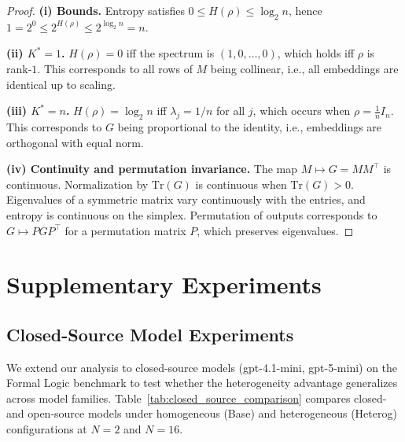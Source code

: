 \documentclass{article}
\theoremstyle{plain}
\theoremstyle{definition}
\theoremstyle{remark}
\begin{document}
\begin{proof}
\textbf{(i) Bounds.}
Entropy satisfies $0\le H(\rho)\le \log_2 n$, hence
$1=2^0\le 2^{H(\rho)}\le 2^{\log_2 n}=n$.

\textbf{(ii) $K^*=1$.}
$H(\rho)=0$ iff the spectrum is $(1,0,\ldots,0)$, which holds iff $\rho$ is rank-$1$.
This corresponds to all rows of $M$ being collinear, i.e., all embeddings are identical up to scaling.

\textbf{(iii) $K^*=n$.}
$H(\rho)=\log_2 n$ iff $\lambda_j=1/n$ for all $j$, which occurs when $\rho=\frac{1}{n}I_n$.
This corresponds to $G$ being proportional to the identity, i.e., embeddings are orthogonal with equal norm.

\textbf{(iv) Continuity and permutation invariance.}
The map $M\mapsto G=MM^\top$ is continuous.
Normalization by $\mathrm{Tr}(G)$ is continuous when $\mathrm{Tr}(G)>0$.
Eigenvalues of a symmetric matrix vary continuously with the entries, and entropy is continuous on the simplex.
Permutation of outputs corresponds to $G\mapsto PGP^\top$ for a permutation matrix $P$, which preserves eigenvalues.
\end{proof}


\section{Supplementary Experiments}

\subsection{Closed-Source Model Experiments}
\label{sec:closed_source}

We extend our analysis to closed-source models (gpt-4.1-mini, gpt-5-mini) on the Formal Logic benchmark to test whether the heterogeneity advantage generalizes across model families.
Table~\ref{tab:closed_source_comparison} compares closed- and open-source models under homogeneous (Base) and heterogeneous (Heterog) configurations at $N\!=\!2$ and $N\!=\!16$.
\end{document}
